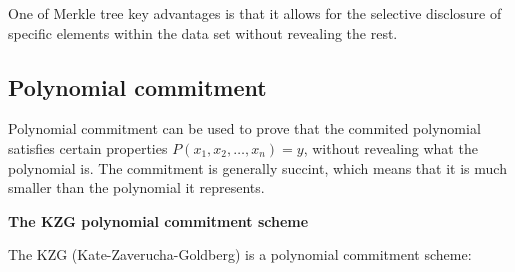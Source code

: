 \documentclass[../lecture-notes.tex]{subfiles}
\begin{document}
One of Merkle tree key advantages is that it allows for the selective disclosure of specific elements within the data set without revealing the rest. 

\subsection{Polynomial commitment}

Polynomial commitment can be used to prove that the commited polynomial satisfies certain properties $P(x_1, x_2, \ldots, x_n) = y$, without revealing what the polynomial is.
The commitment is generally succint, which means that it is much smaller than the polynomial it represents.

\vspace{0.5 cm}

\textbf{The KZG polynomial commitment scheme}

\vspace{0.5 cm}


The KZG (Kate-Zaverucha-Goldberg) is a polynomial commitment scheme:
\end{document}
